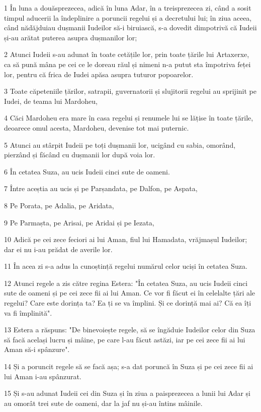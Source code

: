 \par 1 În luna a douăsprezecea, adică în luna Adar, în a treisprezecea zi, când a sosit timpul aducerii la îndeplinire a poruncii regelui și a decretului lui; în ziua aceea, când nădăjduiau dușmanii Iudeilor să-i biruiască, s-a dovedit dimpotrivă că Iudeii și-au arătat puterea asupra dușmanilor lor;
\par 2 Atunci Iudeii s-au adunat în toate cetățile lor, prin toate țările lui Artaxerxe, ca să pună mâna pe cei ce le doreau răul și nimeni n-a putut sta împotriva feței lor, pentru că frica de Iudei apăsa asupra tuturor popoarelor.
\par 3 Toate căpeteniile țărilor, satrapii, guvernatorii și slujitorii regelui au sprijinit pe Iudei, de teama lui Mardoheu,
\par 4 Căci Mardoheu era mare în casa regelui și renumele lui se lățise în toate țările, deoarece omul acesta, Mardoheu, devenise tot mai puternic.
\par 5 Atunci au stârpit Iudeii pe toți dușmanii lor, ucigând cu sabia, omorând, pierzând și făcând cu dușmanii lor după voia lor.
\par 6 În cetatea Suza, au ucis Iudeii cinci sute de oameni.
\par 7 Între aceștia au ucis și pe Parșandata, pe Dalfon, pe Aspata,
\par 8 Pe Porata, pe Adalia, pe Aridata,
\par 9 Pe Parmașta, pe Arisai, pe Aridai și pe Iezata,
\par 10 Adică pe cei zece feciori ai lui Aman, fiul lui Hamadata, vrăjmașul Iudeilor; dar ei nu i-au prădat de averile lor.
\par 11 În acea zi s-a adus la cunoștință regelui numărul celor uciși în cetatea Suza.
\par 12 Atunci regele a zis către regina Estera: "În cetatea Suza, au ucis Iudeii cinci sute de oameni și pe cei zece fii ai lui Aman. Ce vor fi făcut ei în celelalte țări ale regelui? Care este dorința ta? Ea ți se va împlini. Și ce dorință mai ai? Că ea îți va fi împlinită".
\par 13 Estera a răspuns: "De binevoiește regele, să se îngăduie Iudeilor celor din Suza să facă același lucru și mâine, pe care l-au făcut astăzi, iar pe cei zece fii ai lui Aman să-i spânzure".
\par 14 Și a poruncit regele să se facă așa; s-a dat poruncă în Suza și pe cei zece fii ai lui Aman i-au spânzurat.
\par 15 Și s-au adunat Iudeii cei din Suza și în ziua a paisprezecea a lunii lui Adar și au omorât trei sute de oameni, dar la jaf nu și-au întins mâinile.
